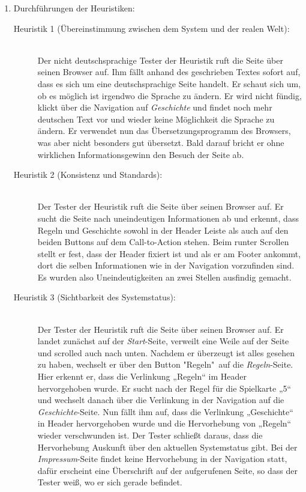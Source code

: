 \documentclass{scrartcl}
\begin{document}
\begin{enumerate}
\item Durchführungen der Heuristiken:
\begin{description}
\item[Heuristik 1 (Übereinstimmung zwischen dem System und der realen Welt):] \ \\ Der nicht deutschsprachige Tester der Heuristik ruft die Seite über seinen Browser auf.
Ihm fällt anhand des geschrieben Textes sofort auf, dass es sich um eine deutschsprachige Seite handelt. Er schaut sich um, ob es möglich ist irgendwo die Sprache zu ändern. Er wird nicht fündig, klickt über die Navigation auf \textit{Geschichte} und findet noch mehr deutschen Text vor und wieder keine Möglichkeit die Sprache zu ändern. Er verwendet nun das Übersetzungsprogramm des Browsers, was aber nicht besonders gut übersetzt. Bald darauf bricht er ohne wirklichen Informationsgewinn den Besuch der Seite ab.
\item[Heuristik 2 (Konsistenz und Standards):]\ \\
Der Tester der Heuristik ruft die Seite über seinen Browser auf. Er sucht die Seite nach uneindeutigen Informationen ab und erkennt, dass Regeln und Geschichte sowohl in der Header
Leiste als auch auf den beiden Buttons auf dem Call-to-Action stehen. Beim runter Scrollen stellt er fest, dass der Header
fixiert ist und als er am Footer ankommt, dort die selben Informationen wie in der Navigation vorzufinden sind. Es wurden also Uneindeutigkeiten an zwei Stellen ausfindig gemacht.
\item[Heuristik 3 (Sichtbarkeit des Systemstatus):] \ \\
Der Tester der Heuristik ruft die Seite über seinen Browser auf. Er landet zunächst auf der \textit{Start}-Seite, verweilt eine Weile auf der Seite und scrolled auch nach unten. Nachdem er überzeugt ist alles gesehen zu haben, wechselt er über den Button "Regeln"\ auf die \textit{Regeln}-Seite. Hier erkennt er, dass die Verlinkung „Regeln“ im Header hervorgehoben wurde. Er sucht nach der Regel für die Spielkarte „5“ und wechselt danach über die Verlinkung in der Navigation auf die \textit{Geschichte}-Seite. Nun fällt ihm auf, dass die Verlinkung „Geschichte“ in Header hervorgehoben wurde und die Hervorhebung von „Regeln“ wieder verschwunden ist. Der Tester schließt daraus, dass die Hervorhebung Auskunft über den aktuellen Systemstatus gibt. 
Bei der \textit{Impressum}-Seite findet keine Hervorhebung in der Navigation statt, dafür erscheint eine Überschrift auf der aufgerufenen Seite, so dass der Tester weiß, wo er sich gerade befindet.

\end{description}
\end{enumerate}
\end{document}
